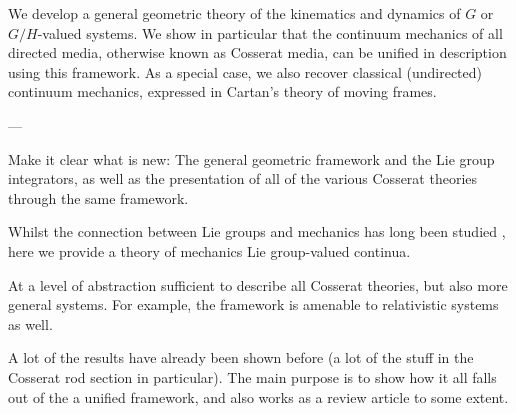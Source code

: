 \documentclass[withindex,glossary,techreport]{cam-thesis}
\begin{document}
We develop a general geometric theory of the kinematics and dynamics of $G$ or $G/H$-valued systems. We show in particular that the continuum mechanics of all directed media, otherwise known as Cosserat media, can be unified in description using this framework. As a special case, we also recover classical (undirected) continuum mechanics, expressed in Cartan's theory of moving frames.

---

Make it clear what is new: The general geometric framework and the Lie group integrators, as well as the presentation of all of the various Cosserat theories through the same framework.

Whilst the connection between Lie groups and mechanics has long been studied \citep{marsdenIntroductionMechanicsSymmetry2013}, here we provide a theory of mechanics Lie group-valued continua.

At a level of abstraction sufficient to describe all Cosserat theories, but also more general systems. For example, the framework is amenable to relativistic systems as well.

A lot of the results have already been shown before (a lot of the stuff in the Cosserat rod section in particular). The main purpose is to show how it all falls out of the a unified framework, and also works as a review article to some extent.





%

\renewcommand{\bibname}{References}
\cleardoublepage
{}
{}












\end{document}
